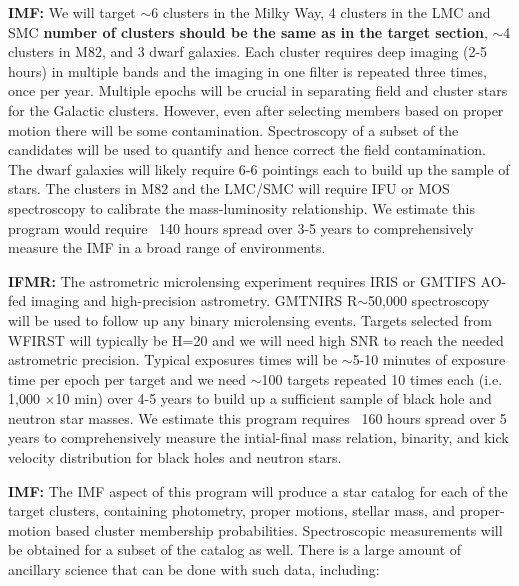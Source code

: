 \documentclass[11pt]{article}
\begin{document}
\obssum

\noindent
{\bf IMF:}
We will target $\sim$6 clusters in the Milky Way, 4 clusters in the LMC and SMC {\bf number of clusters should be the same as in the target section}, $\sim$4 clusters in M82, and 3 dwarf galaxies. Each cluster requires deep imaging (2-5 hours) in multiple bands and the imaging in one filter is repeated three times, once per year. Multiple epochs will be crucial in separating field and cluster stars for the Galactic clusters. However, even after selecting members based on proper motion there will be some contamination. Spectroscopy of a subset of the candidates will be used to quantify and hence correct the field contamination. The dwarf galaxies will likely require 6-6 pointings each to build up the sample of stars. The clusters in M82 and the LMC/SMC will require IFU or MOS spectroscopy to calibrate the mass-luminosity relationship. 
We estimate this program would require ~140 hours spread over 3-5 years to comprehensively measure the IMF in a broad range of environments.

{\bf IFMR:}
The astrometric microlensing experiment requires IRIS or GMTIFS AO-fed imaging and high-precision astrometry. GMTNIRS R$\sim$50,000 spectroscopy will be used to follow up any binary microlensing events. 
Targets selected from WFIRST will typically be H=20 and we will need high SNR to reach the needed astrometric precision. 
Typical exposures times will be $\sim$5-10 minutes of exposure time per epoch per target and we need $\sim$100 targets repeated 10 times each (i.e. 1,000 $\times$10 min) over 4-5 years to build up a sufficient sample of black hole and neutron star masses. We estimate this program requires ~160 hours spread over 5 years to comprehensively measure the intial-final mass relation, binarity, and kick velocity distribution for black holes and neutron stars.



%

\legacyvalue
\noindent
{\bf IMF: } The IMF aspect of this program will produce a star catalog for each of the target clusters, containing photometry, proper motions, stellar mass, and proper-motion based cluster membership probabilities. Spectroscopic measurements will be obtained for a subset of the catalog as well. There is a large amount of ancillary science that can be done with such data, including:
\end{document}
